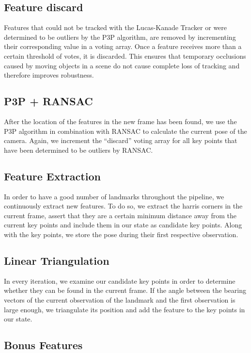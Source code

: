 \documentclass[11pt]{article}
\begin{document}
\subsection{Feature discard}
Features that could not be tracked with the Lucas-Kanade Tracker or were determined to be outliers by the P3P algorithm, are removed by incrementing their corresponding value in a voting array. Once a feature receives more than a certain threshold of votes, it is discarded. This ensures that temporary occlusions caused by moving objects in a scene do not cause complete loss of tracking and therefore improves robustness.

\subsection{P3P + RANSAC}
After the location of the features in the new frame has been found, we use the P3P algorithm in combination with RANSAC to calculate the current pose of the camera. Again, we increment the “discard” voting array for all key points that have been determined to be outliers by RANSAC.

\subsection{Feature Extraction}
In order to have a good number of landmarks throughout the pipeline, we continuously extract new features. To do so, we extract the harris corners in the current frame, assert that they are a certain minimum distance away from the current key points and include them in our state as candidate key points. Along with the key points, we store the pose during their first respective observation.

\subsection{Linear Triangulation} 
In every iteration, we examine our candidate key points in order to determine whether they can be found in the current frame. If the angle between the bearing vectors of the current observation of the landmark and the first observation is large enough, we triangulate its position and add the feature to the key points in our state.

\subsection{Bonus Features}
\end{document}
